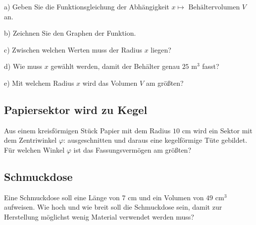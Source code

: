 
a) 
Geben Sie die Funktionsgleichung der Abhängigkeit $x \mapsto \text{ Behältervolumen } V$ an.

b)
Zeichnen Sie den Graphen der Funktion.

c)
Zwischen welchen Werten muss der Radius $x$ liegen?

d)
Wie muss $x$ gewählt werden, damit der Behälter genau $25 \text{ m}^3$
fasst?

e)
Mit welchem Radius $x$ wird das Volumen $V$ am größten?



\subsection{Papiersektor wird zu Kegel}

Aus einem kreisförmigen Stück Papier mit dem Radius  $10 \text{ cm}$ wird ein Sektor mit dem Zentriwinkel $\varphi$: ausgeschnitten und daraus eine kegelförmige Tüte gebildet. Für welchen Winkel $\varphi$ ist das Fassungsvermögen am größten?






\subsection{Schmuckdose}

Eine Schmuckdose soll eine Länge von $7 \text{ cm}$ und ein Volumen
von $49 \text{ cm}^3$ aufweisen. Wie hoch und wie breit soll die
Schmuckdose sein, damit zur Herstellung möglichst wenig Material
verwendet werden muss?

